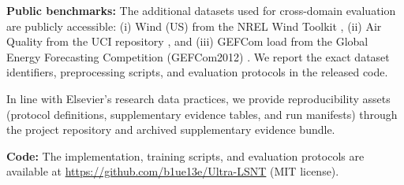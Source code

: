 ﻿\documentclass[review,1p,times]{elsarticle}
\begin{document}
\textbf{Public benchmarks:} The additional datasets used for cross-domain evaluation are publicly accessible: (i) Wind (US) from the NREL Wind Toolkit \cite{draxl2015windtoolkit}, (ii) Air Quality from the UCI repository \cite{devito2008}, and (iii) GEFCom load from the Global Energy Forecasting Competition (GEFCom2012) \cite{Hong2014GEFCom2012}. We report the exact dataset identifiers, preprocessing scripts, and evaluation protocols in the released code.

In line with Elsevier's research data practices, we provide reproducibility assets (protocol definitions, supplementary evidence tables, and run manifests) through the project repository and archived supplementary evidence bundle.

\textbf{Code:} The implementation, training scripts, and evaluation protocols are available at \url{https://github.com/b1ue13e/Ultra-LSNT} (MIT license).

\appendix
\end{document}

